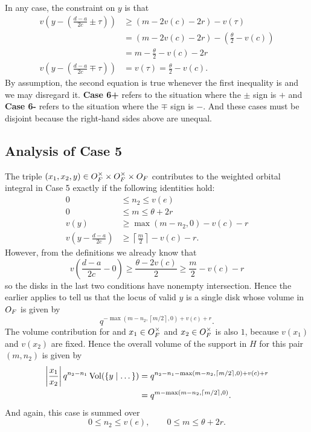 \begin{description}
  In any case, the constraint on $y$ is that
  \begin{align*}
    v\left( y - \left( \frac{d-a}{2c} \pm \tau \right) \right)
      &\ge \left( m - 2v(c) - 2r \right) - v(\tau) \\
      &= \left( m - 2v(c) - 2r \right) - \left( \frac{\theta}{2} - v(c) \right) \\
      &= m - \frac{\theta}{2} - v(c) - 2r \\
    v\left( y - \left( \frac{d-a}{2c} \mp \tau \right) \right) &= v(\tau)
      = \frac{\theta}{2} - v(c).
  \end{align*}
  By assumption, the second equation is true
  whenever the first inequality is and we may disregard it.
  \textbf{Case 6\ts+} refers to the situation where the $\pm$ sign is $+$
  and \textbf{Case 6\ts-} refers to the situation where the $\mp$ sign is $-$.
  And these cases must be disjoint because the right-hand sides above are unequal.
\end{description}

\subsection{Analysis of Case 5}
The triple $(x_1, x_2, y) \in O_F^\times \times O_F^\times \times O_F$
contributes to the weighted orbital integral in Case 5 exactly if the following identities hold:
\begin{align*}
  0 &\le n_2 \le v(e) \\
  0 &\le m \le \theta + 2r \\
  v(y) &\ge \max(m-n_2,0) - v(c) - r \\
  v\left( y - \frac{d-a}{2c} \right) &\ge \left\lceil \frac{m}{2} \right\rceil - v(c) - r.
\end{align*}
However, from the definitions we already know that
\[ v\left( \frac{d-a}{2c} - 0 \right)
  \ge \frac{\theta - 2v(c)}{2} \ge \frac{m}{2} - v(c) - r \]
so the disks in the last two conditions have nonempty intersection.
Hence the earlier  applies to tell us that
the locus of valid $y$ is a single disk whose volume in $O_F$ is given by
\[ q^{-\max\left( m-n_2, \left\lceil m/2 \right\rceil, 0 \right) + v(c) + r}. \]
The volume contribution for and $x_1 \in O_F^\times$ and $x_2 \in O_F^\times$
is also $1$, because $v(x_1)$ and $v(x_2)$ are fixed.
Hence the overall volume of the support in $H$ for this pair $(m, n_2)$ is given by
\begin{align*}
  \left\lvert \frac{x_1}{x_2} \right\rvert q^{n_2 - n_1} \operatorname{Vol}(\{ y \mid \dots \})
  &= q^{n_2 - n_1 -\max\left( m-n_2, \left\lceil m/2 \right\rceil, 0 \right) + v(c) + r} \\
  &= q^{m - \max\left( m-n_2, \left\lceil m/2 \right\rceil, 0 \right)}.
\end{align*}
And again, this case is summed over
\[ 0 \le n_2 \le v(e), \qquad 0 \le m \le \theta + 2r. \]

